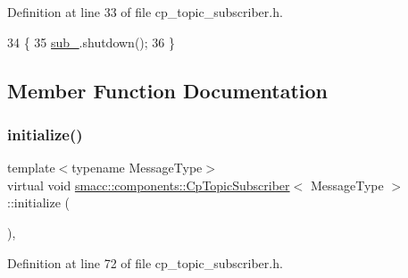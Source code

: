 Definition at line 33 of file cp\+\_\+topic\+\_\+subscriber.\+h.


\begin{DoxyCode}
34     \{
35         \hyperlink{classsmacc_1_1components_1_1CpTopicSubscriber_a87f9c87f6b7c0801dff4fcc7519dbe0e}{sub\_}.shutdown();
36     \}
\end{DoxyCode}


\subsection{Member Function Documentation}
\mbox{\label{classsmacc_1_1components_1_1CpTopicSubscriber_a12a86f96d939cfa509181865d6ec85e9}} 
\subsubsection{\texorpdfstring{initialize()}{initialize()}}
{\footnotesize\ttfamily template$<$typename Message\+Type$>$ \\
virtual void \hyperlink{classsmacc_1_1components_1_1CpTopicSubscriber}{smacc\+::components\+::\+Cp\+Topic\+Subscriber}$<$ Message\+Type $>$\+::initialize (\begin{DoxyParamCaption}{ }\end{DoxyParamCaption})\hspace{0.3cm}{\ttfamily [inline]}, {\ttfamily [virtual]}}



Definition at line 72 of file cp\+\_\+topic\+\_\+subscriber.\+h.


